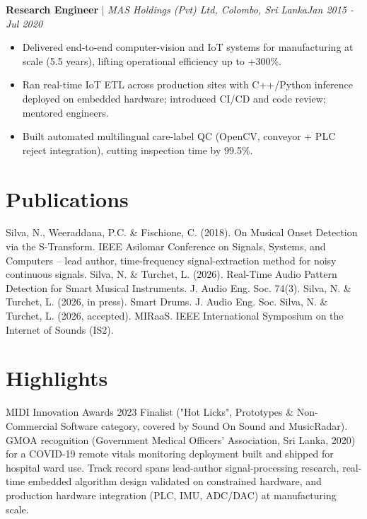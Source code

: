 \documentclass[11pt]{article}
\newenvironment{cvrole}[5]{%
  \par\noindent\textbf{\large #1} | \textit{\small #2, #3}\hfill \textit{\small #4 - #5}\par
  \begin{itemize}[leftmargin=2em, itemsep=-0.3em, topsep=-0.5em]%
}{%
  \end{itemize}\par\noindent\mbox{}\par\vspace{0.1em}%
}
\begin{document}
\begin{cvrole}{Research Engineer}{MAS Holdings (Pvt) Ltd}{Colombo, Sri Lanka}{Jan 2015}{Jul 2020}
\item Delivered end-to-end computer-vision and IoT systems for manufacturing at scale (5.5 years), lifting operational efficiency up to +300\%.
\item Ran real-time IoT ETL across production sites with C++/Python inference deployed on embedded hardware; introduced CI/CD and code review; mentored engineers.
\item Built automated multilingual care-label QC (OpenCV, conveyor + PLC reject integration), cutting inspection time by 99.5\%.
\end{cvrole}

\section*{Publications}
Silva, N., Weeraddana, P.C. \& Fischione, C. (2018). On Musical Onset Detection via the S-Transform. IEEE Asilomar Conference on Signals, Systems, and Computers -- lead author, time-frequency signal-extraction method for noisy continuous signals. Silva, N. \& Turchet, L. (2026). Real-Time Audio Pattern Detection for Smart Musical Instruments. J. Audio Eng. Soc. 74(3). Silva, N. \& Turchet, L. (2026, in press). Smart Drums. J. Audio Eng. Soc. Silva, N. \& Turchet, L. (2026, accepted). MIRaaS. IEEE International Symposium on the Internet of Sounds (IS2).

\section*{Highlights}
MIDI Innovation Awards 2023 Finalist ("Hot Licks", Prototypes \& Non-Commercial Software category, covered by Sound On Sound and MusicRadar). GMOA recognition (Government Medical Officers' Association, Sri Lanka, 2020) for a COVID-19 remote vitals monitoring deployment built and shipped for hospital ward use. Track record spans lead-author signal-processing research, real-time embedded algorithm design validated on constrained hardware, and production hardware integration (PLC, IMU, ADC/DAC) at manufacturing scale.
\end{document}
